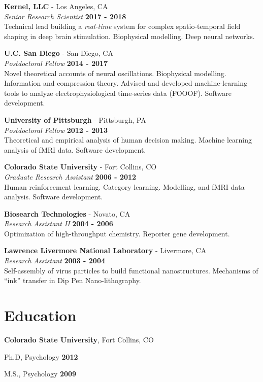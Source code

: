 \documentclass[margin,line]{res}
\newenvironment{list1}{
  \begin{list}{\ding{113}}{%
      \setlength{\itemsep}{0in}
      \setlength{\parsep}{0in} \setlength{\parskip}{0in}
      \setlength{\topsep}{0in} \setlength{\partopsep}{0in}
      \setlength{\leftmargin}{0.17in}}}{\end{list}}
\begin{document}
\begin{resume}
{\bf Kernel, LLC} - Los Angeles, CA\\
{\em Senior Research Scientist} \hfill {\bf 2017 - 2018}\\
Technical lead building a \emph{real-time} system for complex spatio-temporal field shaping in deep brain stimulation. Biophysical modelling. Deep neural networks.

{\bf U.C. San Diego} - San Diego, CA\\
{\em Postdoctoral Fellow} \hfill {\bf 2014 - 2017}\\
Novel theoretical accounts of neural oscillations. Biophysical modelling. Information and compression theory. Advised and developed machine-learning tools to analyze electrophysiological time-series data (FOOOF). Software development.

{\bf University of Pittsburgh} - Pittsburgh, PA\\
{\em Postdoctoral Fellow} \hfill {\bf 2012 - 2013}\\
Theoretical and empirical analysis of human decision making. Machine learning analysis of fMRI data. Software development.

{\bf Colorado State University} - Fort Collins, CO\\
{\em Graduate Research Assistant} \hfill {\bf 2006 - 2012}\\
Human reinforcement learning. Category learning. Modelling, and fMRI data analysis. Software development.

{\bf Biosearch Technologies} - Novato, CA\\
{\em Research Assistant II} \hfill {\bf 2004 - 2006}\\
Optimization of high-throughput chemistry. Reporter gene development.

{\bf Lawrence Livermore National Laboratory} - Livermore, CA\\
{\em Research Assistant} \hfill {\bf 2003 - 2004}\\
Self-assembly of virus particles to build functional nanostructures. Mechanisms of ``ink'' transfer in Dip Pen Nano-lithography.

\section{\sc Education}
{\bf Colorado State University}, Fort Collins, CO\\
\vspace*{-.1in}
\begin{list1}
\item[] Ph.D, Psychology \hfill {\bf 2012}
\item[] M.S., Psychology \hfill {\bf 2009}
\end{list1}


\end{resume}
\end{document}
